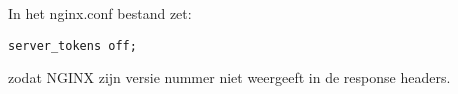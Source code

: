In het nginx.conf bestand zet:
\begin{lstlisting}
server_tokens off;
\end{lstlisting}
zodat NGINX zijn versie nummer niet weergeeft in de response headers.
